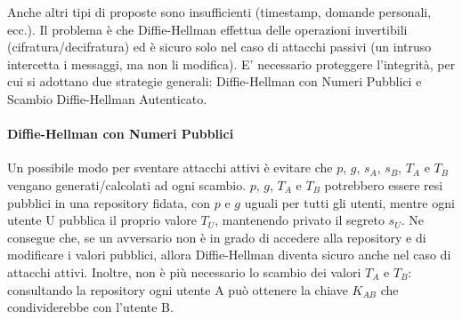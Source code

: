 Anche altri tipi di proposte sono insufficienti (timestamp, domande personali, ecc.). Il problema è che Diffie-Hellman effettua delle operazioni invertibili (cifratura/decifratura) ed è sicuro solo nel caso di attacchi passivi (un intruso intercetta i messaggi, ma non li modifica). E' necessario proteggere l'integrità, per cui si adottano due strategie generali: Diffie-Hellman con Numeri Pubblici e Scambio Diffie-Hellman Autenticato.	


\paragraph{Diffie-Hellman con Numeri Pubblici} Un possibile modo per sventare attacchi attivi è evitare che $p$, $g$, $s_{A}$, $s_{B}$, $T_{A}$ e $T_{B}$ vengano generati/calcolati ad ogni scambio. $p$, $g$, $T_{A}$ e $T_{B}$ potrebbero essere resi pubblici in una repository fidata, con $p$ e $g$ uguali per tutti gli utenti, mentre ogni utente U pubblica il proprio valore $T_{U}$, mantenendo privato il segreto $s_{U}$. Ne consegue che, se un avversario non è in grado di accedere alla repository e di modificare i valori pubblici, allora Diffie-Hellman diventa sicuro anche nel caso di attacchi attivi. Inoltre, non è più necessario lo scambio dei valori $T_{A}$ e $T_{B}$: consultando la repository ogni utente A può ottenere la chiave $K_{AB}$ che condividerebbe con l'utente B. \\

